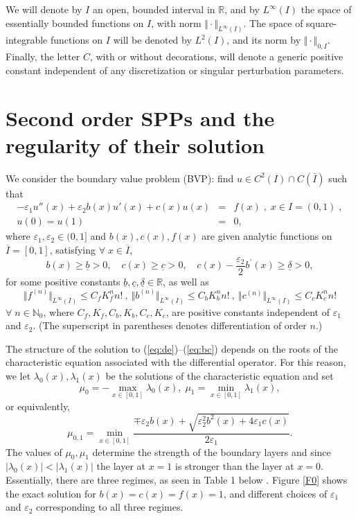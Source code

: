 \documentclass[11pt]{article}
\providecommand{\e}{\varepsilon}
\theoremstyle{plain}
\theoremstyle{definition}
\theoremstyle{remark}
\numberwithin{equation}{section}
\begin{document}
We will denote by $I$ an open, bounded interval in $\mathbb{R}$, and by $L^{\infty}(I)$ the space of
essentially bounded functions on $I$, with norm $\Vert \cdot \Vert_{L^{\infty}(I)}$. The space of square-integrable
functions on $I$ will be denoted by $L^2(I)$, and its norm by $\Vert \cdot \Vert_{0,I}$. Finally, the letter $C$, with or without decorations, will denote a generic positive constant independent of any discretization
or singular perturbation parameters.


\section{Second order SPPs and the regularity of their solution}
\label{sec:model}
We consider the boundary value problem (BVP): find $u \in C^2(I) \cap C(\bar{I})$ such that
\begin{eqnarray}
-\e_1 u''(x) + \e_2  b(x)u'(x) + c(x) u(x) &=& f(x) \; , \; x \in I = (0,1) \; , \label{eq:de} \\
u(0) =  u(1)&=& 0, \label{eq:bc}
\end{eqnarray}
%
where $\e_1, \e_2 \in (0,1]$ and $b(x), c(x), f(x)$ are given analytic functions on
$\overline{I}=[0,1]$, satisfying $\forall \;x \in \overline{I}$,
$$
b(x) \geq \underline{b}>0, \quad c(x) \geq \underline{c}>0, \quad c(x)-\frac{\varepsilon_2}{2} b^{\prime}(x) \geq \underline{\delta} >0,
$$
%
for some positive constants $\underline{b}, \underline{c}, \underline{\delta} \in \mathbb{R}$, as well as
%
\begin{equation}
\label{eq:analytic}
\Vert f^{(n)} \Vert_{L^{\infty}(I)} \leq C_f K^n_f n! \: , \: \Vert b^{(n)} \Vert_{L^{\infty}(I)} \leq C_b K^n_b n! 
 \: , \: \Vert c^{(n)} \Vert_{L^{\infty}(I)} \leq C_c K^n_c n!
\end{equation}
%
$\forall \; n \in \mathbb{N}_0$,  where $C_f, K_f, C_b, K_b, C_c, K_c$, are positive constants independent of $\e_1$ and  $\e_2$.
(The superscript in parentheses denotes differentiation of order $n$.)

The structure of the solution to (\ref{eq:de})--(\ref{eq:bc}) depends on the roots of the characteristic
equation associated with the differential operator. For this reason, we let $\lambda_0(x), \lambda_1(x)$ be the solutions of the characteristic equation and set
%
\begin{equation}\label{mu}
\mu_0=-\max _{x \in[0,1]} \lambda_0(x), \; \mu_1=\min _{x \in[0,1]} \lambda_1(x),
\end{equation}
%
or equivalently,
$$
\mu_{0,1}=\min _{x \in[0,1]} \frac{\mp \varepsilon_2 b(x)+\sqrt{\varepsilon_2^2 b^2(x)+4 \varepsilon_1 c(x)}}{2 \varepsilon_1}.
$$
The values of $\mu_0, \mu_1$ determine the strength of the boundary layers and since $\left|\lambda_0(x)\right|< \left|\lambda_1(x)\right|$ the layer at $x=1$ is stronger than the layer at $x=0$. Essentially, there are three regimes, as seen in Table 1 below \cite{L}. Figure \ref{F0} shows the exact solution for $b(x)=c(x)=f(x)=1$, and different choices of $\e_1$ and  $\e_2$ corresponding to all three regimes.
\end{document}
